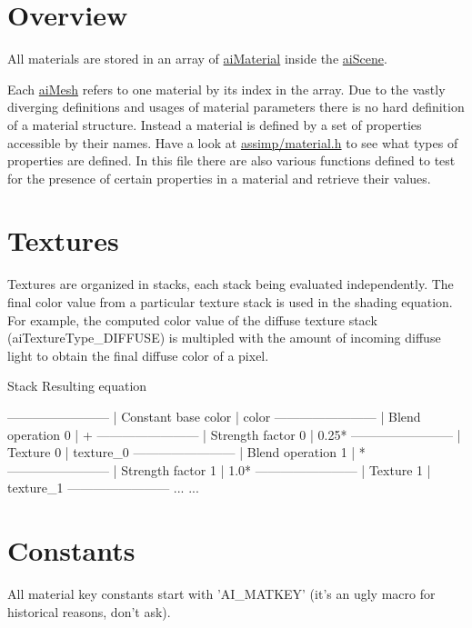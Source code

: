 \hypertarget{extend_General}{}\section{Overview}\label{extend_General}
All materials are stored in an array of \hyperlink{classai_material}{ai\+Material} inside the \hyperlink{structai_scene}{ai\+Scene}.

Each \hyperlink{structai_mesh}{ai\+Mesh} refers to one material by its index in the array. Due to the vastly diverging definitions and usages of material parameters there is no hard definition of a material structure. Instead a material is defined by a set of properties accessible by their names. Have a look at \hyperlink{material_8h}{assimp/material.\+h} to see what types of properties are defined. In this file there are also various functions defined to test for the presence of certain properties in a material and retrieve their values.\hypertarget{materials_mat_tex}{}\section{Textures}\label{materials_mat_tex}
Textures are organized in stacks, each stack being evaluated independently. The final color value from a particular texture stack is used in the shading equation. For example, the computed color value of the diffuse texture stack (ai\+Texture\+Type\+\_\+\+D\+I\+F\+F\+U\+S\+E) is multipled with the amount of incoming diffuse light to obtain the final diffuse color of a pixel.


\begin{DoxyCode}
 Stack                               Resulting equation

------------------------
| Constant base color  |             color
------------------------ 
| Blend operation 0    |             +
------------------------
| Strength factor 0    |             0.25*
------------------------
| Texture 0            |             texture\_0
------------------------ 
| Blend operation 1    |             *
------------------------
| Strength factor 1    |             1.0*
------------------------
| Texture 1            |             texture\_1
------------------------
  ...                                ...
\end{DoxyCode}
\hypertarget{materials_keys}{}\section{Constants}\label{materials_keys}
All material key constants start with 'A\+I\+\_\+\+M\+A\+T\+K\+E\+Y' (it's an ugly macro for historical reasons, don't ask).


